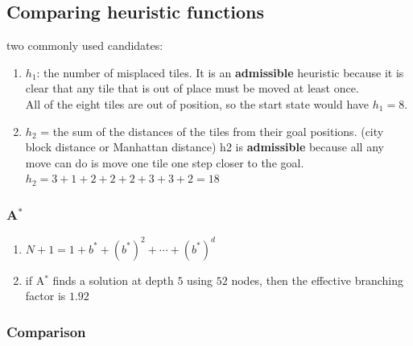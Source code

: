 \subsection{Comparing heuristic functions}

two commonly used candidates:
\begin{enumerate}[itemsep=0.2cm]
    \item $h_1$: the number of misplaced tiles. 
    It is an \textbf{admissible} heuristic because it is clear that any tile that is out of place must be moved at least once.
    \hfill \cite{ai/book/Artificial-Intelligence-A-Modern-Approach/Russell-Norvig}
    \\
    All of the eight tiles are out of position, so the start state would have $h_1 = 8$.
    \hfill \cite{ai/book/Artificial-Intelligence-A-Modern-Approach/Russell-Norvig}

    \item $h_2$ = the sum of the distances of the tiles from their goal positions. 
    (city block distance or Manhattan distance)
    h2 is \textbf{admissible} because all any move can do is move one tile one step closer to the goal.
    \hfill \cite{ai/book/Artificial-Intelligence-A-Modern-Approach/Russell-Norvig}
    \\
    $h_2 = 3 + 1 + 2 + 2 + 2 + 3 + 3 + 2 = 18$
    \hfill \cite{ai/book/Artificial-Intelligence-A-Modern-Approach/Russell-Norvig}
\end{enumerate}


\subsubsection{A$^\ast$ \cite{ai/book/Artificial-Intelligence-A-Modern-Approach/Russell-Norvig}}

\begin{enumerate}[itemsep=0.2cm]
    \item $N +1=1+ b^\ast + (b^\ast)^2 + \cdots + (b^\ast)^d$
    \hfill \cite{ai/book/Artificial-Intelligence-A-Modern-Approach/Russell-Norvig}

    \item if A$^\ast$ finds a solution at depth $5$ using $52$ nodes, then the effective branching factor is $1.92$
    \hfill \cite{ai/book/Artificial-Intelligence-A-Modern-Approach/Russell-Norvig}
\end{enumerate}



\subsubsection{Comparison \cite{ai/book/Artificial-Intelligence-A-Modern-Approach/Russell-Norvig}}

